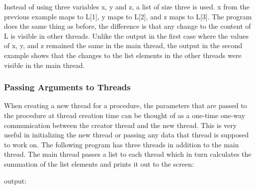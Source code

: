 Instead of using three variables \textsf{x},
\textsf{y} and \textsf{z}, a list of size three
is used. \textsf{x} from the previous example maps to
\textsf{L[1]}, \textsf{y} maps to
\textsf{L[2]}, and z maps to \textsf{L[3]}. The
program does the same thing as before, the difference is that any
change to the content of \textsf{L} is visible in other
threads. Unlike the output in the first case where the values of
\textsf{x}, \textsf{y}, and \textsf{z}
remained the same in the main thread, the output in the second example
shows that the changes to the list elements in the other threads were
visible in the main thread.

\subsubsection[Passing Arguments to Threads]{Passing Arguments to
Threads}

When creating a new thread for a procedure, the parameters that are
passed to the procedure at thread creation time can be thought of as a
one-time one-way communication between the creator thread and the new
thread. This is very useful in initializing the new thread or passing
any data that thread is supposed to work on. The following program has
three threads in addition to the main thread. The main thread passes a
list to each thread which in turn calculates the summation of the list
elements and prints it out to the screen:


output:

